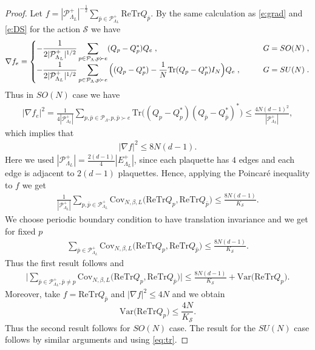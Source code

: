 \documentclass[11pt,UTF-8,reqno]{amsart}
\numberwithin{equation}{section}
\def\var{{\mathrm{Var}}}
\def\cov{{\mathrm{Cov}}}
\def\tr{\mathrm {tr}}
\def\cP{{\mathcal P}}
\def\cS{{\mathcal S}}
\def\mZ{{\mathbb Z}}
\def\leq{\leqslant}
\def\tr{\mathrm {tr}}
\def\tr{{\rm Tr}}
\def\leq{\leqslant}
\begin{document}
\begin{proof}
	Let $f= |\mathcal{P}_{\Lambda_L}^+|^{-\frac12}     \sum_{\bar p\in \mathcal{P}_{\Lambda_L}^+}\mathrm{ReTr} Q_{\bar p}$.
	By the same calculation as \eqref{e:grad} and \eqref{e:DS} for the action $\cS$ we have
	\begin{align*}
		\nabla f_{e}=
		\begin{cases}
			\displaystyle
			-\frac1{2|\mathcal{P}_{\Lambda_L}^+|^{1/2}} \sum_{p\in \cP_\Lambda,p\succ e}(Q_p-Q_p^*)Q_e\;,
			&\qquad
			G= SO(N) \;,
			\\
			\displaystyle
			-\frac1{2|\mathcal{P}_{\Lambda_L}^+|^{1/2}}\sum_{p\in \cP_\Lambda ,p\succ e}
			\Big( (Q_p-{Q}_p^{*}) - \frac{1}{N}\tr(Q_p-{Q}_p^{*}) I_N\Big)   Q_e\;,
			&\qquad
			G = SU(N)\;.
		\end{cases}
	\end{align*}
	Thus in $SO(N)$ case we have
	\begin{align*}
		|\nabla f_e|^2
		=\frac1{4|\mathcal{P}_{\Lambda_L}^+|}\sum_{p,\bar p\in \cP_\Lambda,p,\bar p\succ e}\mathrm{Tr}\Big((Q_p-Q_p^*)(Q_{\bar p}-Q_{\bar p}^*)^*\Big)\leq \frac{4N(d-1)^2}{|\mathcal{P}_{\Lambda_L}^+|},
	\end{align*}
	which implies that
	\begin{align*}|\nabla f|^2\leq 8N(d-1).
	\end{align*}
	Here we used
	$|\mathcal{P}_{\Lambda_L}^+|
	=\frac{2(d-1)}{4}|E_{\Lambda_L}^+|
	$, since each plaquette has $4$ edges and each edge is adjacent to $2(d-1)$ plaquettes.
	Hence,  applying the Poincar\'e inequality to $f$ we get
	\begin{align*}
		\frac1{|\mathcal{P}_{\Lambda_L}^+|}\sum_{p,\bar p\in \mathcal{P}_{\Lambda_L}^+}\cov_{N,\beta,L}\Big(\mathrm{ReTr}Q_p,\mathrm{ReTr} Q_{\bar p}\Big)\leq \frac{8N(d-1)}{K_\cS }.
	\end{align*}
	We  choose periodic boundary condition to have translation invariance and we get for fixed  $p$
	\begin{align*}
		\sum_{\bar p\in \mathcal{P}_{\Lambda_L}^+}\cov_{N,\beta,L}\Big(\mathrm{ReTr}Q_p,\mathrm{ReTr} Q_{\bar p}\Big)\leq \frac{8N(d-1)}{K_\cS }.
	\end{align*}
	Thus the first result follows and
	\begin{align*}
		\Big|
		\sum_{\bar p\in \mathcal{P}_{\Lambda_L}^+,\bar p\neq p}\cov_{N,\beta,L}\Big(\mathrm{ReTr}Q_p,\mathrm{ReTr} Q_{\bar p}\Big)
		\Big|
		\leq \frac{8N(d-1)}{K_\cS }+\var\Big(\mathrm{ReTr}Q_p \Big) .
	\end{align*}
	Moreover, take $f=\mathrm{ReTr} Q_{\bar p}$  and $|\nabla f|^2\leq 4N$ %
	and we obtain
	$$
	\var\Big(\mathrm{ReTr}Q_p\Big)\leq \frac{4N}{K_\cS }.
	$$
	Thus the second result follows for $SO(N)$ case.
	The result for the $SU(N)$ case follows by similar arguments and using \eqref{eq:tr}.
\end{proof}
\end{document}
